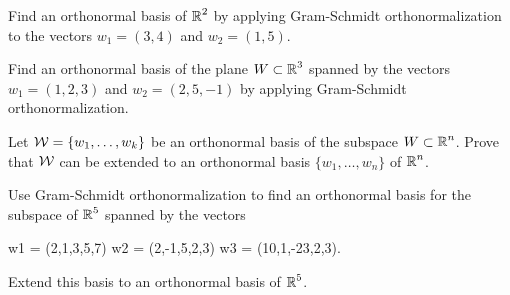 \documentclass{ximera}
\begin{document}
\EXER

\TEXER

\begin{exercise} \label{c7.5.1}
Find an orthonormal basis of $\mbox{$\Bbb{R}$}^2$ by applying Gram-Schmidt
orthonormalization to the vectors $w_1=(3,4)$ and $w_2=(1,5)$.
\end{exercise}

\begin{exercise} \label{c7.5.2}
Find an orthonormal basis of the plane $W\subset\mbox{$\Bbb{R}$}^3$ spanned by the
vectors $w_1=(1,2,3)$ and $w_2=(2,5,-1)$ by applying Gram-Schmidt
orthonormalization.
\end{exercise}

\begin{exercise} \label{c7.5.3}
Let ${\cal W}=\{w_1,\ldots,w_k\}$ be an orthonormal basis of the subspace
$W\subset\mbox{$\Bbb{R}$}^n$.  Prove that ${\cal W}$ can be extended to an orthonormal
basis $\{w_1,\ldots,w_n\}$ of $\mbox{$\Bbb{R}$}^n$.
\end{exercise}

\CEXER

\begin{exercise} \label{c7.5.4}
Use Gram-Schmidt orthonormalization to find an orthonormal basis for the
subspace of $\mbox{$\Bbb{R}$}^5$ spanned by the vectors
\begin{matlabEquation}\label{MATLAB:61}
w1 = (2,1,3,5,7) \quad w2 = (2,-1,5,2,3) \AND w3 = (10,1,-23,2,3).
\end{matlabEquation}
Extend this basis to an orthonormal basis of $\mbox{$\Bbb{R}$}^5$.
\end{exercise}
\end{document}
